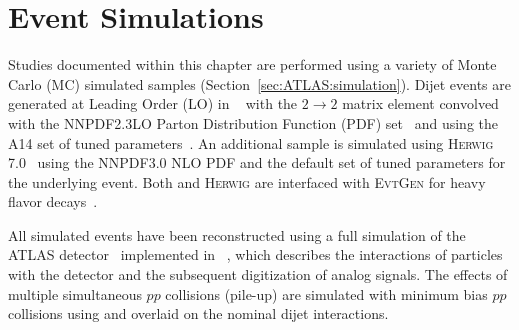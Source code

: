 \section{Event Simulations}
\label{sec:GenNI:atlas}

Studies documented within this chapter are performed using a variety of Monte Carlo (MC) simulated samples (Section~\ref{sec:ATLAS:simulation}).
Dijet events are generated at Leading Order (LO) in ~\cite{Sjostrand:2007gs} with the $2 \rightarrow 2$ matrix element convolved with the NNPDF2.3LO Parton Distribution Function (PDF) set~\cite{Ball:2012cx} and using the A14 set of tuned parameters~\cite{ATL-PHYS-PUB-2014-021}.
An additional sample is simulated using \textsc{Herwig} 7.0~\cite{Bellm:2015jjp} using the NNPDF3.0 NLO PDF and the default set of tuned parameters for the underlying event.
Both \PYTHIA{} and \textsc{Herwig} are interfaced with \textsc{EvtGen} for heavy flavor decays~\cite{Lange:2001uf,ATL-PHYS-PUB-2014-008}.



All simulated events have been reconstructed using a full simulation of the ATLAS detector~\cite{SOFT-2010-01} implemented in ~\cite{Agostinelli:2002hh}, which describes the interactions of particles with the detector and the subsequent digitization of analog signals.
The effects of multiple simultaneous $pp$ collisions (pile-up) are simulated with minimum bias $pp$ collisions using  and overlaid on the nominal dijet interactions.

